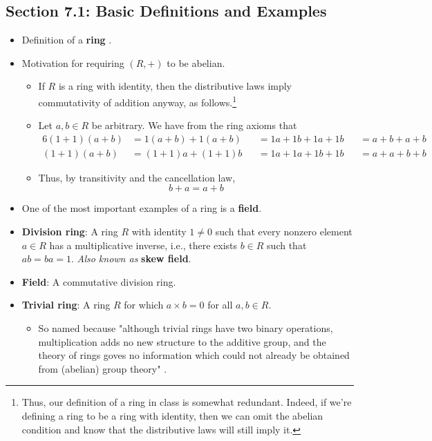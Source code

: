 \documentclass[../notes.tex]{subfiles}
\begin{document}
\subsection*{Section 7.1: Basic Definitions and Examples}
\begin{itemize}
    \item Definition of a \textbf{ring} \parencite[223]{bib:DummitFoote}.
    \item Motivation for requiring $(R,+)$ to be abelian.
    \begin{itemize}
        \item If $R$ is a ring with identity, then the distributive laws imply commutativity of addition anyway, as follows.\footnote{Thus, our definition of a ring in class is somewhat redundant. Indeed, if we're defining a ring to be a ring with identity, then we can omit the abelian condition and know that the distributive laws will still imply it.}
        \item Let $a,b\in R$ be arbitrary. We have from the ring axioms that
        \begin{alignat*}{6}
            (1+1)(a+b) &= 1(a+b)+1(a+b)&
                &= 1a+1b+1a+1b&
                &= a+b+a+b\\
            (1+1)(a+b) &= (1+1)a+(1+1)b&
                &= 1a+1a+1b+1b&
                &= a+a+b+b
        \end{alignat*}
        \item Thus, by transitivity and the cancellation law,
        \begin{equation*}
            b+a = a+b
        \end{equation*}
    \end{itemize}
    \item One of the most important examples of a ring is a \textbf{field}.
    \item \textbf{Division ring}: A ring $R$ with identity $1\neq 0$ such that every nonzero element $a\in R$ has a multiplicative inverse, i.e., there exists $b\in R$ such that $ab=ba=1$. \emph{Also known as} \textbf{skew field}.
    \item \textbf{Field}: A commutative division ring.
    \item \textbf{Trivial ring}: A ring $R$ for which $a\times b=0$ for all $a,b\in R$.
    \begin{itemize}
        \item So named because "although trivial rings have two binary operations, multiplication adds no new structure to the additive group, and the theory of rings goves no information which could not already be obtained from (abelian) group theory" \parencite[224]{bib:DummitFoote}.

\end{itemize}
\end{itemize}
\end{document}
